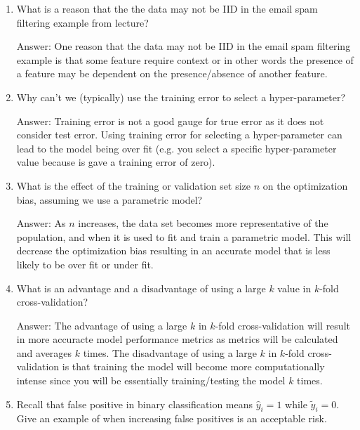 \documentclass{article}
\newcommand{\gre}[1]{\textcolor{gre}{#1}}
\newcommand\ans[1]{\par\gre{Answer: #1}}
\begin{document}
    \begin{enumerate}
        \item What is a reason that the the data may not be IID in the email spam filtering example from lecture?

        \ans{One reason that the data may not be IID in the email spam filtering example is that some feature require context or in other words the presence of a feature may be dependent on the presence/absence of another feature.}
        
        \item Why can't we (typically) use the training error to select a hyper-parameter?

        \ans{Training error is not a good gauge for true error as it does not consider test error. Using training error for selecting a hyper-parameter can lead to the model being over fit (e.g. you select a specific hyper-parameter value because is gave a training error of zero). }
        

        \item What is the effect of the training or validation set size $n$ on the optimization bias, assuming we use a parametric model?

        \ans{ As $n$ increases, the data set becomes more representative of the population, and when it is used to fit and train a parametric model. This will decrease the optimization bias resulting in an accurate model that is less likely to be over fit or under fit.}

        \item What is an advantage and a disadvantage of using a large $k$ value in $k$-fold cross-validation?

        \ans{ \newline The advantage of using a large $k$ in $k$-fold cross-validation will result in more accuracte model performance metrics as metrics will be calculated and averages $k$ times. \newline \newline The disadvantage of using a large $k$ in $k$-fold cross-validation is that training the model will become more computationally intense since you will be essentially training/testing the model $k$ times. }

        \item Recall that false positive in binary classification means $\hat y_i=1$ while $\tilde y_i = 0$. Give an example of when increasing false positives is an acceptable risk.


\end{enumerate}
\end{document}
